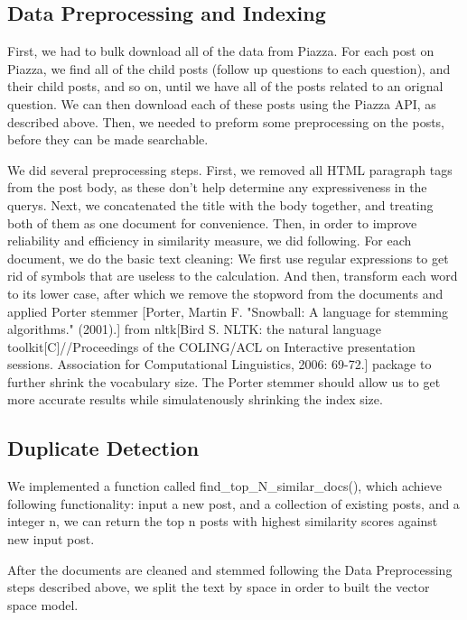 \documentclass[sigconf]{acmart}
\begin{document}
\subsection{Data Preprocessing and Indexing}
First, we had to bulk download all of the data from Piazza. For each post on Piazza, we find all of the child posts (follow up questions to each question), and their child posts, and so on, until we have all of the posts related to an orignal question. We can then download each of these posts using the Piazza API, as described above. Then, we needed to preform some preprocessing on the posts, before they can be made searchable.

We did several preprocessing steps. First, we removed all HTML paragraph tags from the post body, as these don't help determine any expressiveness in the querys. Next, we concatenated the title with the body together, and treating both of them as one document for convenience. 
Then, in order to improve reliability and efficiency in similarity measure, we did following. For each document, we do the basic text cleaning: We first use regular expressions to get rid of symbols that are useless to the calculation. And then, transform each word to its lower case, after which we remove the stopword from the documents and applied Porter stemmer [Porter, Martin F. "Snowball: A language for stemming algorithms." (2001).] from nltk[Bird S. NLTK: the natural language toolkit[C]//Proceedings of the COLING/ACL on Interactive presentation sessions. Association for Computational Linguistics, 2006: 69-72.] package to further shrink the vocabulary size. The Porter stemmer should allow us to get more accurate results while simulatenously shrinking the index size.

\subsection{Duplicate Detection}
We implemented a function called find\_top\_N\_similar\_docs(), which achieve following functionality: input a new post, and a collection of existing posts, and a integer n, we can return the top n posts with highest similarity scores against new input post. 

 After the documents are cleaned and stemmed following the Data Preprocessing steps described above, we split the text by space in order to built the vector space model. 
\end{document}
